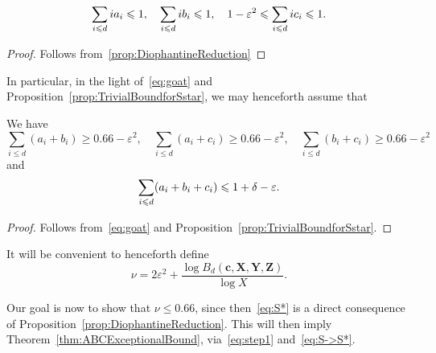 \begin{lemma}\label{lem:aibiciconstraints}
  \leanok
  \begin{equation}\label{eq:oat1}
  \sum_{i\leqslant d} ia_i \leqslant 1, \quad \sum_{i\leqslant d} ib_i \leqslant 1, \quad 1-\varepsilon^2\leqslant \sum_{i\leqslant d} ic_i \leqslant 1.
  \end{equation}
\end{lemma}
\begin{proof}
  Follows from~\ref{prop:DiophantineReduction}
\end{proof}

In particular, in the light of~\eqref{eq:goat} and Proposition~\ref{prop:TrivialBoundforSstar}, we may henceforth assume that
\begin{lemma}\label{lem:Trivialaibici}
  \leanok
  We have
  \begin{equation}\label{eq:oat4}
  \sum_{i\leq d} (a_i+b_i)\geq 0.66-\varepsilon^2,\quad \sum_{i\leq d} (a_i+c_i)\geq 0.66-\varepsilon^2,\quad
  \sum_{i\leq d} (b_i+c_i) \geq 0.66-\varepsilon^2
  \end{equation} and
  \begin{equation}\label{eq:oat3}
  \sum_{i\leqslant d} (a_i+b_i+c_i) \leqslant 1+\delta-\varepsilon.
  \end{equation}
\end{lemma}
\begin{proof}
  Follows from~\eqref{eq:goat} and Proposition~\ref{prop:TrivialBoundforSstar}.
\end{proof}

\begin{definition}\label{def:nu}
  It will be convenient to henceforth define
  \begin{equation*}
    \nu=2\varepsilon^2+\frac{\log B_d(\mathbf{c},\mathbf{X},\mathbf{Y},\mathbf{Z})}{\log X}.
  \end{equation*}
\end{definition}

Our goal is now to show that $\nu\le 0.66$, since then~\eqref{eq:S*}
is a direct consequence of
Proposition~\ref{prop:DiophantineReduction}.
This will then imply
Theorem~\ref{thm:ABCExceptionalBound}, via~\eqref{eq:step1} and~\eqref{eq:S->S*}.

